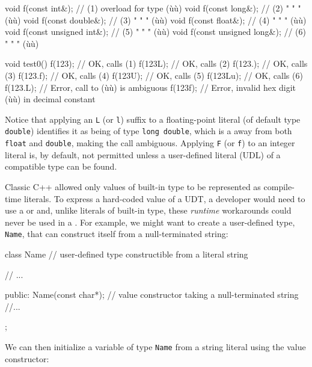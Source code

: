 \begin{emcppslisting}
void f(const int&);            // (1) overload for type (ù{}ù)
void f(const long&);           // (2)    "      "   "   (ù{}ù)
void f(const double&);         // (3)    "      "   "   (ù{}ù)
void f(const float&);          // (4)    "      "   "   (ù{}ù)
void f(const unsigned int&);   // (5)    "      "   "   (ù{}ù)
void f(const unsigned long&);  // (6)    "      "   "   (ù{}ù)

void test0()
{
    f(123);    // OK, calls (1)
    f(123L);   // OK, calls (2)
    f(123.);   // OK, calls (3)
    f(123.f);  // OK, calls (4)
    f(123U);   // OK, calls (5)
    f(123Lu);  // OK, calls (6)
    f(123.L);  // Error, call to (ù{}ù) is ambiguous
    f(123f);   // Error, invalid hex digit (ù{}ù) in decimal constant
}
\end{emcppslisting}
    
\noindent Notice that applying an \lstinline!L! (or \lstinline!l!) suffix to a
floating-point literal (of default type \lstinline!double!) identifies it
as being of type \lstinline!long!~\lstinline!double!, which is a
 away from both \lstinline!float! and
\lstinline!double!, making the call ambiguous. Applying \lstinline!F! (or
\lstinline!f!) to an integer literal is, by default, not permitted unless a
user-defined literal (UDL) of a compatible type can be found.

Classic C++ allowed only values of built-in type to be represented as
compile-time literals. To express a hard-coded value of a UDT, a
developer would need to use a  or
 and, unlike literals of built-in type, these
\emph{runtime} workarounds could never be used in a . For example, we might want to create a user-defined type,
\lstinline!Name!, that can construct itself from a null-terminated string:

\begin{emcppslisting}
class Name  // user-defined type constructible from a literal string
{
    // ...

public:
    Name(const char*);  // value constructor taking a null-terminated string
    //...
};
\end{emcppslisting}
    
\noindent We can then initialize a variable of type \lstinline!Name! from a string
literal using the value constructor:

